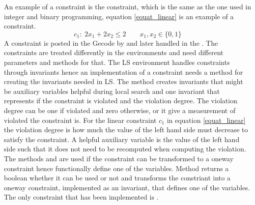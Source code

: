 An example of a constraint is the  constraint, which is the same as the one used in integer and binary 
programming, equation \ref{equat_linear} is an example of a  constraint. 
\begin{equation}
 c_1: \; 2x_1 + 2x_2 \leq 2  \qquad x_1,x_2 \in \{0,1\}
\end{equation} \label{equat_linear}
A constraint is posted in the Gecode  by  and later handled in the 
. The 
constraints are treated differently in the environments and need different parameters and methods for that. The LS 
environment handles constraints through invariants hence an implementation of a constraint needs a method for 
creating the invariants needed in LS. The method  creates invariants that 
might be auxiliary variables helpful during local search and one invariant that represents 
if the constraint is violated and the violation degree. The violation degree can be one if violated and zero 
otherwise, or it give a measurement of violated the constraint is. For the linear constraint $c_1$ in equation 
\ref{equat_linear} the violation degree is how much the value of the left hand side must decrease to satisfy the 
constraint. A helpful auxiliary variable is the value of the left hand side such that it does not need to be recomputed 
when computing the violation. \\
The methods  and  are used if the constraint can be transformed 
to a oneway constraint hence functionally define one of the variables. Method  returns a 
boolean whether it can be used or not and  transforms the constriant into a oneway constraint, 
implemented as an invariant, that defines one of the variables. The only constraint that has been implemented is 
. 
